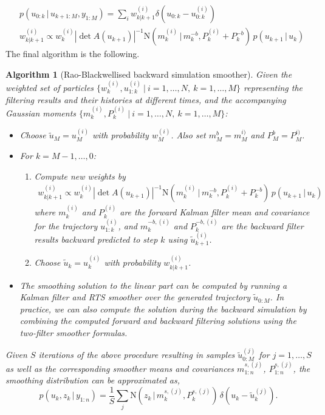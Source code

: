 \documentclass[twocolumn]{autart}    %
\newtheorem{algo}{Algorithm}[section]
\begin{document}
%
%
\begin{equation}
\begin{split}
  &p(u_{0:k}\,|\,u_{k+1:M},y_{1:M}) = \sum_i w_{k|k+1}^{(i)} \delta(u_{0:k} - u^{(i)}_{0:k}) \\
  &w_{k|k+1}^{(i)} \propto w^{(i)}_k |\det A(u_{k+1})|^{-1} \mathrm{N}(m_k^{(i)}\,|\,m^{-b}_{k},P_k^{(i)}+P^{-b}_{k}) \, p(u_{k+1}\,|\,u_{k})
\end{split}
\label{eq:rbbacksimeq}
\end{equation}
%
The final algorithm is the following.
%
\begin{algo}[Rao-Blackwellised backward simulation smoother]
  \label{alg:rbbssmooth}
  Given the weighted set of particles $\{ w_k^{(i)}, u_{1:k}^{(i)} ~|~ i=1,\ldots,N,~k=1,\ldots,M \}$ representing the filtering results and their histories at different times, and the accompanying Gaussian moments $\{ m_k^{(i)}, P_k^{(i)} ~|~ i=1,\ldots,N,~k=1,\ldots,M \}$:
\begin{itemize}
\item Choose $\tilde{u}_M = u_M^{(i)}$ with probability $w^{(i)}_{M}$. Also set $m_M^b = m_M^{i)}$ and $P_M^b = P_M^{i)}$.
\item For $k=M-1,\ldots,0$:
\begin{enumerate}
  \item Compute new weights by
    \begin{equation}
      \begin{split}
        w_{k|k+1}^{(i)} \propto w^{(i)}_k |\det A(u_{k+1})|^{-1} \mathrm{N}(m_k^{(i)}\,|\,m^{-b}_{k},P_k^{(i)}+P^{-b}_{k}) \, p(u_{k+1}\,|\,u_{k})
     \end{split}
    \end{equation}
    where $m^{(i)}_k$ and $P^{(i)}_k$ are the forward Kalman filter mean and covariance for the trajectory $u_{1:k}^{(i)}$, and     $m^{-b,(i)}_{k}$ and $P^{-b,(i)}_{k}$ are the backward filter  results backward predicted to step $k$ using $\tilde{u}_{k+1}^{(i)}$. \item Choose $\tilde{u}_k = u_k^{(i)}$ with probability $w^{(i)}_{k|k+1}$.
  \end{enumerate}
\item The smoothing solution to the linear part can be computed by running a Kalman filter and RTS smoother over the generated trajectory $\tilde{u}_{0:M}$. In practice, we can also compute the solution during the backward simulation by combining the computed forward and backward filtering solutions using the two-filter smoother formulas.
\end{itemize}
%
Given $S$ iterations of the above procedure resulting in samples $\tilde{u}_{0:M}^{(j)}$ for $j=1,\ldots,S$ as well as the corresponding smoother means and covariances $m^{s,(j)}_{1:n}$, $P^{s,(j)}_{1:n}$, the smoothing distribution can be approximated as,
%
\begin{equation}
  p(u_k,z_k\,|\,y_{1:n})
  = \frac{1}{S} \sum_j \mathrm{N}(z_k\,|\,m_k^{s,(j)},P_k^{s,(j)}) \,
  \delta(u_k - \tilde{u}_k^{(j)}).
\nonumber
\end{equation}
\end{algo}
\end{document}
